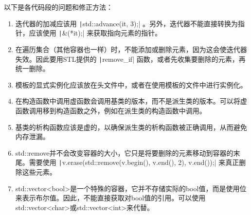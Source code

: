 \begin{answer}
    以下是各代码段的问题和修正方法：
    \begin{enumerate}
        \item 迭代器的加减应该用 \texttt|std::advance(it, 3);| 。另外，迭代器不能直接转换为指针，应该使用 \texttt|&(*it);| 来获取指向元素的指针。
        \item 在遍历集合（其他容器也一样）时，不能添加或删除元素，因为这会使迭代器失效。因此要用STL提供的 \texttt|remove_if| 函数，或者先收集要删除的元素，再统一删除。
        \item 模板的显式实例化应该放在头文件中，或者在使用模板的文件中进行实例化。
        \item 在构造函数中调用虚函数会调用基类的版本，而不是派生类的版本。可以将虚函数调用移到构造函数之外，例如在派生类的构造函数中调用。
        \item 基类的析构函数应该是虚的，以确保派生类的析构函数被正确调用，从而避免内存泄漏。
        \item std::remove并不会改变容器的大小，它只是将要删除的元素移动到容器的末尾。需要使用 \texttt|v.erase(std::remove(v.begin(), v.end(), 2), v.end());| 来真正删除这些元素。
        \item std::vector<bool>是一个特殊的容器，它并不存储实际的bool值，而是使用位来表示布尔值。因此，不能直接获取对bool值的引用。可以使用std::vector<char>或std::vector<int>来代替。
    \end{enumerate}
\end{answer}
